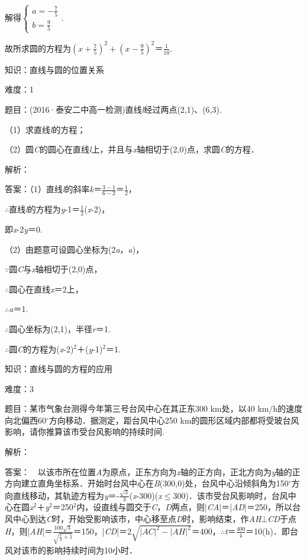 \documentclass{article} %
\begin{document}
解得$\left\{\begin{array}{r} a=-\frac{7}{5}\\ b=\frac{9}{5} \end{array} \right.$.

故所求圆的方程为$(x+\frac{7}{5})^2+(x-\frac{9}{5})^2$＝$\frac{1}{10}$.

知识：直线与圆的位置关系

难度：1

题目：(2016·泰安二中高一检测)直线\textit{l}经过两点(2,1)、(6,3).

（1）求直线\textit{l}的方程；

（2）圆\textit{C}的圆心在直线\textit{l}上，并且与\textit{x}轴相切于(2,0)点，求圆\textit{C}的方程．

解析：

答案：（1）直线\textit{l}的斜率\textit{k}＝$\frac{3-1}{6-2}$＝$\frac{1}{2}$，

$\mathrm{\therefore}$直线\textit{l}的方程为\textit{y}-1＝$\frac{1}{2}$(\textit{x}-2)，

即\textit{x}-2\textit{y}＝0.

（2）由题意可设圆心坐标为(2\textit{a}，\textit{a})，

$\mathrm{\because}$圆\textit{C}与\textit{x}轴相切于(2,0)点，

$\mathrm{\therefore}$圆心在直线\textit{x}＝2上，

$\mathrm{\therefore}$\textit{a}＝1.

$\mathrm{\therefore}$圆心坐标为(2,1)，半径\textit{r}＝1.

$\mathrm{\therefore}$圆\textit{C}的方程为(\textit{x}-2)${}^{2}$＋(\textit{y}-1)${}^{2}$＝1.

知识：直线与圆的方程的应用

难度：3

题目：某市气象台测得今年第三号台风中心在其正东300 km处，以40 km/h的速度向北偏西60$\mathrm{{}^\circ}$方向移动．据测定，距台风中心250 km的圆形区域内部都将受玻台风影响，请你推算该市受台风影响的持续时间.

解析：

答案：　以该市所在位置\textit{A}为原点，正东方向为\textit{x}轴的正方向，正北方向为\textit{y}轴的正方向建立直角坐标系．开始时台风中心在\textit{B}(300,0)处，台风中心沿倾斜角为150$\mathrm{{}^\circ}$方向直线移动，其轨迹方程为\textit{y}＝-$\frac{\sqrt{3}}{3}$(\textit{x}-300)(\textit{x}$\mathrm{\le}$300)．该市受台风影响时，台风中心在圆\textit{x}${}^{2}$＋\textit{y}${}^{2}$＝250${}^{2}$内，设直线与圆交于\textit{C}，\textit{D}两点，则|\textit{CA}|＝|\textit{AD}|＝250，所以台风中心到达\textit{C}时，开始受影响该市，中心移至点\textit{D}时，影响结束，作\textit{AH}$\mathrm{\bot}$\textit{CD}于点\textit{H}，则|\textit{AH}|＝$\frac{100\sqrt{3}}{\sqrt{\frac{1}{3}+1}}$＝150，|\textit{CD}|＝2$\sqrt{|AC|^2-|AH|^2}$＝400，$\mathrm{\therefore}$\textit{t}＝$\frac{400}{4}$＝10(h)．即台风对该市的影响持续时间为10小时．
\end{document}
